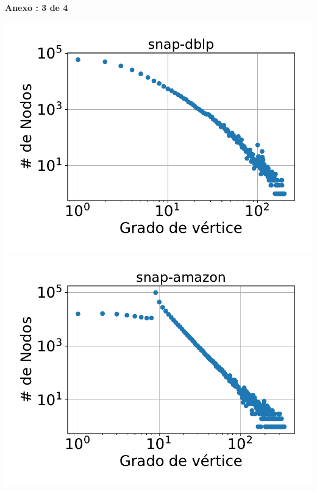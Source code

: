 \newpage
\centering
\textbf{Anexo \thechapter:  3 de 4}
\begin{minipage}{1\textwidth}
    \centering
    \includegraphics[width=.9\linewidth]{img/grades/snap-dblp.pdf} \\
    \includegraphics[width=.9\linewidth]{img/grades/snap-amazon.pdf} \\
\end{minipage}

